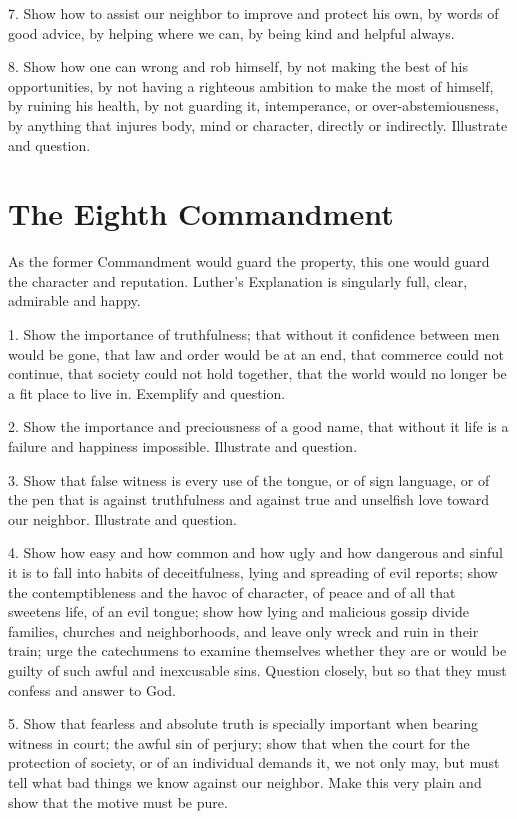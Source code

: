  7. Show how to assist our neighbor to improve and protect his own, by words of good advice, by helping where we can, by being kind and helpful always.

 8. Show how one can wrong and rob himself, by not making the best of his opportunities, by not having a righteous ambition to make the most of himself, by ruining his health, by not guarding it, intemperance, or over-abstemiousness, by anything that injures body, mind or character, directly or indirectly. Illustrate and question.

\section{The Eighth Commandment}

As the former Commandment would guard the property, this one would guard the character and
reputation. Luther’s Explanation is singularly full, clear, admirable and happy.

 1. Show the importance of truthfulness; that without it confidence between men would be gone, that law and order would be at an end, that commerce could not continue, that society could not hold together, that the world would no longer be a fit place to live in. Exemplify and question.

2. Show the importance and preciousness of a good name, that without it life is a failure and happiness impossible. Illustrate and question.

3. Show that false witness is every use of the tongue, or of sign language, or of the pen that is against truthfulness and against true and unselfish love toward our neighbor. Illustrate and question.

 4. Show how easy and how common and how ugly and how dangerous and sinful it is to fall into habits of deceitfulness, lying and spreading of evil reports; show the contemptibleness and the havoc of character, of peace and of all that sweetens life, of an evil tongue; show how lying and malicious gossip divide families, churches and neighborhoods, and leave only wreck and ruin in their train; urge the catechumens to examine themselves whether they are or would be guilty of such awful and inexcusable sins. Question closely, but so that they must confess and answer to God.

5. Show that fearless and absolute truth is specially
important when bearing witness in court; the awful sin of perjury; show that when the court for the protection of society, or of an individual demands it, we not only may, but must tell what bad things we know against our neighbor. Make this very plain and show that the motive must be pure.

